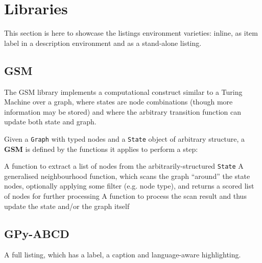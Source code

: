 \section{Libraries}
\label{sec:Libraries}

This section is here to showcase the listings environment varieties:
inline, as item label in a description environment and as a stand-alone listing. 



\subsection{GSM}
\label{sec:Sub_GSM}

The \acrlong{GSM} library \cite{GSM} implements a computational construct similar to a Turing Machine over a graph,
where states are node combinations (though more information may be stored) and where the arbitrary transition function
can update both state and graph.

\begin{defn}\label{def:GSM}
Given a \lstinline{Graph} with typed nodes and a \lstinline{State} object of arbitrary structure,
a \textbf{\gls{GSM}} is defined by the functions it applies to perform a step:
\begin{description}[noitemsep]
     A function to extract a list of nodes from the arbitrarily-structured \lstinline{State} 
     A generalised neighbourhood function, which scans the graph ``around'' the state nodes, 
            optionally applying some filter (e.g. node type), and returns a scored list of nodes for further processing
     A function to process the scan result and thus update the state and/or the graph itself
\end{description}
\end{defn}



\subsection{GPy-ABCD}
\label{sec:Sub_GPyABCD}

A full listing, which has a label, a caption and language-aware highlighting.

